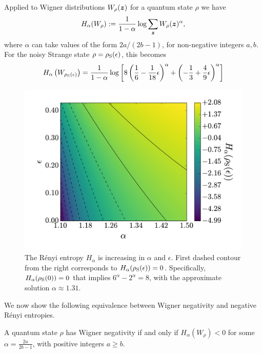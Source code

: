 \documentclass[pra,
aps,
twocolumn,
superscriptaddress,
groupedaddress,
nofootinbib,
reprint
]{revtex4-1}
\begin{document}
Applied to Wigner distributions $W_\rho (\boldsymbol{z})$ for a quantum state $\rho$ we have
\begin{equation}
	H_\alpha(W_\rho) := \frac{1}{1-\alpha} \log \sum_{\bm{z}} W_{\rho}(\bm{z})^\alpha,
\end{equation}
where $\alpha$ can take values of the form $2a / (2b-1)$, for non-negative integers $a,b$. For the noisy Strange state $\rho = \rho_{\rm{S}}(\epsilon)$, this becomes
\begin{align}
	H_{\alpha}\left(W_{\rho_{\rm{S}}(\epsilon)}\right) = \frac{1}{1-\alpha}\log \left[ 8\left( \frac{1}{6} - \frac{1}{18}\epsilon \right)^\alpha + \left(-\frac{1}{3} + \frac{4}{9}\epsilon \right)^\alpha \right] \nonumber\\
\end{align}
\begin{figure}[t!]
    \centering
    \includegraphics[scale=0.3]{figs/H_vs_eps_a.pdf}
    \caption{The R\'{e}nyi entropy $H_\alpha$ is increasing in $\alpha$ and $\epsilon$. First dashed contour from the right corresponds to $H_\alpha(\rho_{\rm{S}}(\epsilon)) = 0$. Specifically, $H_\alpha(\rho_{\rm{S}}(0)) = 0$ that implies $6^\alpha - 2^{\alpha} = 8$, with the approximate solution $\alpha \approx 1.31$.
    }
    \label{fig:H}
\end{figure}
We now show the following equivalence between Wigner negativity and negative R\'{e}nyi entropies.
\begingroup
\def\thetheorem{\ref{thm:HSchur}}
\begin{theorem}
	A quantum state $\rho$ has Wigner negativity if and only if $H_\alpha(W_\rho) < 0$ for some $\alpha =  \frac{2a}{2b-1}$, with positive integers $a \geq b$.
\end{theorem}
\end{document}
